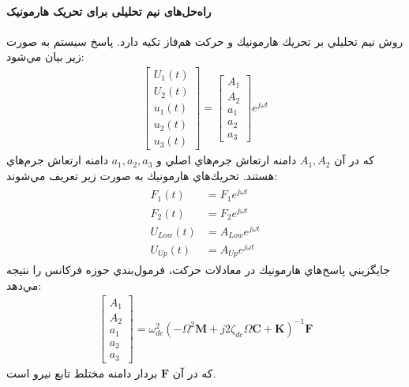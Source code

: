 \paragraph{راه‌حل‌های نیم تحلیلی برای تحریک هارمونیک}
روش نيم تحليلي بر تحريك هارمونيك و حركت هم‌فاز تكيه دارد. پاسخ سيستم به صورت زير بيان مي‌شود:
\begin{align}\label{Eq.harmonic.solution.2dof3dof}
    \begin{bmatrix}
        U_1(t) \\
        U_2(t) \\
        u_1(t) \\
        u_2(t) \\
        u_3(t)
    \end{bmatrix} =
    \begin{bmatrix}
        A_1 \\
        A_2 \\
        a_1 \\
        a_2 \\
        a_3
    \end{bmatrix} e^{j \omega t}
\end{align}
كه در آن $A_1, A_2$ دامنه ارتعاش جرم‌هاي اصلي و $a_1, a_2, a_3$ دامنه ارتعاش جرم‌هاي  هستند.
تحريك‌هاي هارمونيك به صورت زير تعريف مي‌شوند:
\begin{align}\label{Eq.harmonic.excitations.2dof3dof}
    \begin{split}
        F_1(t) &= F_1 e^{j \omega t} \\
        F_2(t) &= F_2 e^{j \omega t} \\
        U_{Low}(t) &= A_{Low} e^{j \omega t} \\
        U_{Up}(t) &= A_{Up} e^{j \omega t}
    \end{split}
\end{align}
جايگزيني پاسخ‌هاي هارمونيك در معادلات حركت، فرمول‌بندي حوزه فركانس را نتيجه مي‌دهد:
\begin{align}\label{Eq.frequency.domain.2dof3dof}
    \begin{bmatrix}
        A_1 \\
        A_2 \\
        a_1 \\
        a_2 \\
        a_3
    \end{bmatrix} = \omega_{dc}^2 \left( -\Omega^2 \mathbf{M} + j 2 \zeta_{dc} \Omega \mathbf{C} + \mathbf{K} \right)^{-1} \mathbf{F}
\end{align}
كه در آن $\mathbf{F}$ بردار دامنه مختلط تابع نيرو است.
